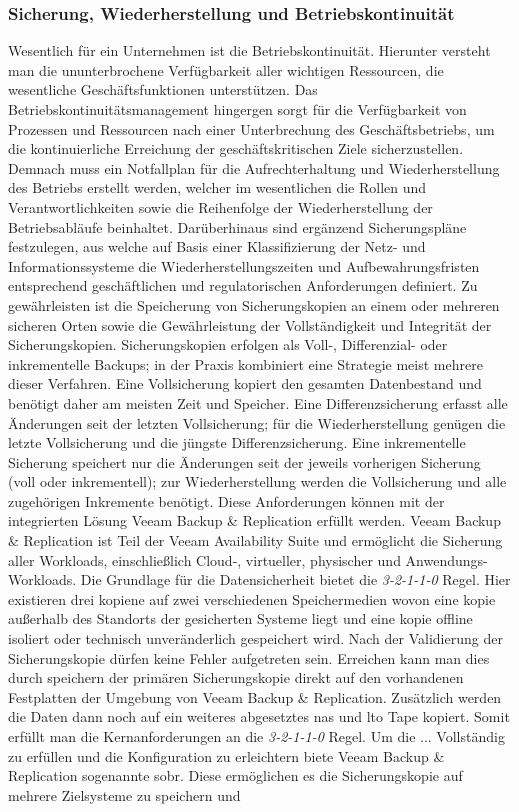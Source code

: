 \documentclass[11pt,a4paper,hidelinks]{article}   %
\begin{document}
            \subsubsection{Sicherung, Wiederherstellung und Betriebskonti­nuität}
            Wesentlich für ein Unternehmen ist die Betriebskontinuität. Hierunter versteht man die ununterbrochene Verfügbarkeit aller wichtigen Ressourcen, die wesentliche Geschäftsfunktionen unterstützen. Das Betriebskontinuitätsmanagement hingergen sorgt für die Verfügbarkeit von Prozessen und Ressourcen nach einer Unterbrechung des Geschäftsbetriebs, um die kontinuierliche Erreichung der geschäftskritischen Ziele sicherzustellen. Demnach muss ein Notfallplan für die Aufrechterhaltung und Wiederherstellung des Betriebs erstellt werden, welcher im wesentlichen die Rollen und Verantwortlichkeiten sowie die Reihenfolge der Wiederherstellung der Betriebsabläufe beinhaltet. Darüberhinaus sind ergänzend Sicherungspläne festzulegen, aus welche auf Basis einer Klassifizierung der Netz- und Informationssysteme die Wiederherstellungszeiten und Aufbewahrungsfristen entsprechend geschäftlichen und regulatorischen Anforderungen definiert. Zu gewährleisten ist die Speicherung von Sicherungskopien an einem oder mehreren sicheren Orten sowie die Gewährleistung der Vollständigkeit und Integrität der Sicherungskopien. Sicherungskopien erfolgen als Voll-, Differenzial- oder inkrementelle Backups; in der Praxis kombiniert eine Strategie meist mehrere dieser Verfahren. Eine Vollsicherung kopiert den gesamten Datenbestand und benötigt daher am meisten Zeit und Speicher. Eine Differenzsicherung erfasst alle Änderungen seit der letzten Vollsicherung; für die Wiederherstellung genügen die letzte Vollsicherung und die jüngste Differenzsicherung. Eine inkrementelle Sicherung speichert nur die Änderungen seit der jeweils vorherigen Sicherung (voll oder inkrementell); zur Wiederherstellung werden die Vollsicherung und alle zugehörigen Inkremente benötigt. Diese Anforderungen können mit der integrierten Lösung Veeam Backup \& Replication erfüllt werden. Veeam Backup \& Replication ist Teil der Veeam Availability Suite und ermöglicht die Sicherung aller Workloads, einschließlich Cloud-, virtueller, physischer und Anwendungs-Workloads. Die Grundlage für die Datensicherheit bietet die \emph{3-2-1-1-0} Regel. Hier existieren drei kopiene auf zwei verschiedenen Speichermedien wovon eine kopie außerhalb des Standorts der gesicherten Systeme liegt und eine kopie offline isoliert oder technisch unveränderlich gespeichert wird. Nach der Validierung der Sicherungskopie dürfen keine Fehler aufgetreten sein. Erreichen kann man dies durch speichern der primären Sicherungskopie direkt auf den vorhandenen Festplatten der Umgebung von Veeam Backup \& Replication. Zusätzlich werden die Daten dann noch auf ein weiteres abgesetztes \gls{nas} und \gls{lto} Tape kopiert. Somit erfüllt man die Kernanforderungen an die \emph{3-2-1-1-0} Regel. Um die ... Vollständig zu erfüllen und die Konfiguration zu erleichtern biete Veeam Backup \& Replication sogenannte \gls{sobr}. Diese ermöglichen es die Sicherungskopie auf mehrere Zielsysteme zu speichern und 
\end{document}
